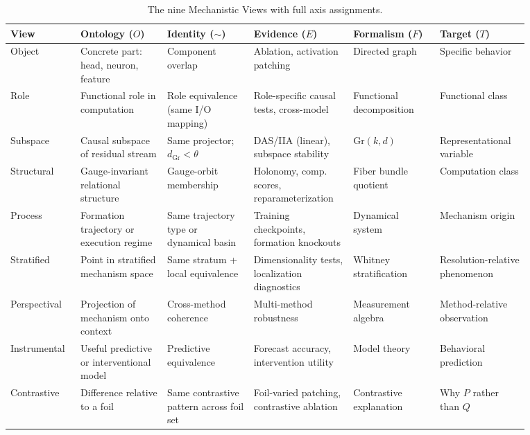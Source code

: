 \documentclass{article}
\newcommand{\Gr}{\mathrm{Gr}}
\begin{document}
\begin{table}[H]
\centering
\small
\setlength{\tabcolsep}{4pt}
\begin{tabular}{p{0.10\linewidth}p{0.15\linewidth}p{0.15\linewidth}p{0.17\linewidth}p{0.15\linewidth}p{0.15\linewidth}}
\toprule
\textbf{View} & \textbf{Ontology ($O$)} & \textbf{Identity ($\sim$)}
  & \textbf{Evidence ($E$)} & \textbf{Formalism ($F$)} & \textbf{Target ($T$)} \\
\midrule
Object
  & Concrete part: head, neuron, feature
  & Component overlap
  & Ablation, activation patching
  & Directed graph
  & Specific behavior \\[3pt]
Role
  & Functional role in computation
  & Role equivalence (same I/O mapping)
  & Role-specific causal tests, cross-model
  & Functional decomposition
  & Functional class \\[3pt]
Subspace
  & Causal subspace of residual stream
  & Same projector; $d_{\Gr} < \theta$
  & DAS/IIA (linear), subspace stability
  & $\Gr(k,d)$
  & Representational variable \\[3pt]
Structural
  & Gauge-invariant relational structure
  & Gauge-orbit membership
  & Holonomy, comp. scores, reparameterization
  & Fiber bundle quotient
  & Computation class \\[3pt]
Process
  & Formation trajectory or execution regime
  & Same trajectory type or dynamical basin
  & Training checkpoints, formation knockouts
  & Dynamical system
  & Mechanism origin \\[3pt]
Stratified
  & Point in stratified mechanism space
  & Same stratum + local equivalence
  & Dimensionality tests, localization diagnostics
  & Whitney stratification
  & Resolution-relative phenomenon \\[3pt]
Perspectival
  & Projection of mechanism onto context
  & Cross-method coherence
  & Multi-method robustness
  & Measurement algebra
  & Method-relative observation \\[3pt]
Instrumental
  & Useful predictive or interventional model
  & Predictive equivalence
  & Forecast accuracy, intervention utility
  & Model theory
  & Behavioral prediction \\[3pt]
Contrastive
  & Difference relative to a foil
  & Same contrastive pattern across foil set
  & Foil-varied patching, contrastive ablation
  & Contrastive explanation
  & Why $P$ rather than $Q$ \\
\bottomrule
\end{tabular}
\caption{The nine Mechanistic Views with full axis assignments.}
\label{tab:atlas}
\end{table}
\end{document}
